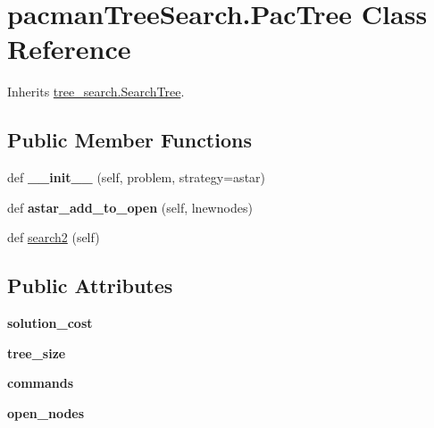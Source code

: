 \hypertarget{classpacman_tree_search_1_1_pac_tree}{}\section{pacman\+Tree\+Search.\+Pac\+Tree Class Reference}
\label{classpacman_tree_search_1_1_pac_tree}


Inherits \hyperlink{classtree__search_1_1_search_tree}{tree\+\_\+search.\+Search\+Tree}.

\subsection*{Public Member Functions}
\begin{DoxyCompactItemize}
\item 
\mbox{\label{classpacman_tree_search_1_1_pac_tree_a641a84e77f21747d0a2e91e33ef14ac1}} 
def {\bfseries \+\_\+\+\_\+init\+\_\+\+\_\+} (self, problem, strategy=\textquotesingle{}astar\textquotesingle{})
\item 
\mbox{\label{classpacman_tree_search_1_1_pac_tree_a544bf36fbe8fa3145beddd6bf239a277}} 
def {\bfseries astar\+\_\+add\+\_\+to\+\_\+open} (self, lnewnodes)
\item 
def \hyperlink{classpacman_tree_search_1_1_pac_tree_a8e481a1b3b4f948610589b0c912d6537}{search2} (self)
\end{DoxyCompactItemize}
\subsection*{Public Attributes}
\begin{DoxyCompactItemize}
\item 
\mbox{\label{classpacman_tree_search_1_1_pac_tree_aa521c4508c4242e1b610e89ef667d703}} 
{\bfseries solution\+\_\+cost}
\item 
\mbox{\label{classpacman_tree_search_1_1_pac_tree_a678279fd2730f260a5a1dcfa838044bf}} 
{\bfseries tree\+\_\+size}
\item 
\mbox{\label{classpacman_tree_search_1_1_pac_tree_ae192209c0a76e07aff61f1f7ea050907}} 
{\bfseries commands}
\item 
\mbox{\label{classpacman_tree_search_1_1_pac_tree_a36489e915cefb6497338cef8788a6f30}} 
{\bfseries open\+\_\+nodes}
\end{DoxyCompactItemize}


